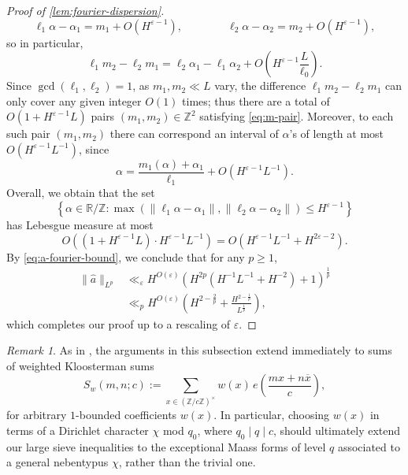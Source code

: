 \documentclass[reqno,11pt]{amsart}
\theoremstyle{remark}
\newtheorem*{remark}{Remark}
\numberwithin{equation}{section}
\newcommand{\Z}{\mathbb{Z}}
\newcommand{\R}{\mathbb{R}}
\newcommand{\eps}{\varepsilon}
\renewcommand{\bar}{\overline}
\renewcommand{\hat}{\widehat}
\begin{document}
\begin{proof}[Proof of \cref{lem:fourier-dispersion}]
\[
    \ell_1 \alpha - \alpha_1 = m_1 + O\left(H^{\eps-1}\right), 
    \qquad\qquad 
    \ell_2 \alpha - \alpha_2 = m_2 + O\left(H^{\eps-1}\right),
\]
so in particular,
\begin{equation} \label{eq:m-pair}
    \ell_1 m_2 - \ell_2 m_1 = \ell_2\alpha_1 - \ell_1 \alpha_2
     + O\left(H^{\eps-1} \frac{L}{\ell_0}\right).
\end{equation}
Since $\gcd(\ell_1, \ell_2) = 1$, as $m_1, m_2 \ll L$ vary, the difference $\ell_1 m_2 - \ell_2 m_1$ can only cover any given integer $O(1)$ times; thus there are a total of $O(1 + H^{\eps-1} L)$ pairs $(m_1, m_2) \in \Z^2$ satisfying \cref{eq:m-pair}. Moreover, to each such pair $(m_1, m_2)$ there can correspond an interval of $\alpha$'s of length at most $O(H^{\eps-1} L^{-1})$, since 
\[
    \alpha = \frac{m_1(\alpha) + \alpha_1}{\ell_1} + O\left(H^{\eps-1} L^{-1}\right).
\]
Overall, we obtain that the set
\[
    \left\{\alpha \in \R/\Z : \max\left(\|\ell_1 \alpha - \alpha_1\|, \|\ell_2 \alpha - \alpha_2\|\right) \le H^{\eps-1} \right\}
\]
has Lebesgue measure at most
\[
    O\left(\left(1 + H^{\eps-1} L\right) \cdot H^{\eps-1}L^{-1}\right) 
    =
    O\left(H^{\eps-1} L^{-1} + H^{2\eps-2}\right).
\]
By \cref{eq:a-fourier-bound}, we conclude that for any $p \ge 1$,
\[
\begin{aligned}
    \|\hat{a}\|_{L^p} &\ll_\eps H^{O(\eps)} \left(H^{2p} \left(H^{-1} L^{-1} + H^{-2}\right) + 1\right)^{\frac{1}{p}}
    \\
    &\ll_p H^{O(\eps)} \left(H^{2-\frac{2}{p}} + \frac{H^{2-\frac{1}{p}}}{L^{\frac{1}{p}}}\right),
\end{aligned}
\]
which completes our proof up to a rescaling of $\eps$.
\end{proof}



\begin{remark}
As in \cite{shparlinski2018character}, the arguments in this subsection extend immediately to sums of weighted Kloosterman sums %
\[
    S_w(m, n; c) := \sum_{x \in (\Z/c\Z)^\times} w(x)\, e\left(\frac{mx + n\bar{x}}{c}\right),
\]
for arbitrary $1$-bounded coefficients $w(x)$. In particular, choosing $w(x)$ in terms of a Dirichlet character $\chi$ mod $q_0$, where $q_0 \mid q \mid c$, should ultimately extend our large sieve inequalities to the exceptional Maass forms of level $q$ associated to a general nebentypus $\chi$, rather than the trivial one.
\end{remark}
\end{document}
